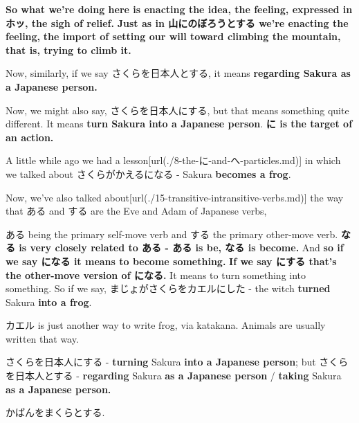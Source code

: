 \thinrule

{\bf So what we're doing here is enacting the idea, the feeling, expressed in ホッ, the sigh of relief.} {\bf Just as in 山にのぼろうとする we're enacting the feeling,} {\bf the import of setting our will toward climbing the mountain, that is, trying to climb it.}

\startsectionlevel[title={とする & にする},reference={とする-にする}]

Now, similarly, if we say さくらを日本人とする, it means {\bf regarding Sakura as a Japanese person.}

{}

Now, we might also say, さくらを日本人にする, but that means something quite different. It means {\bf turn Sakura into a Japanese person}. {\bf に is the target of an action.}

\thinrule

A little while ago we had a lesson\goto{{[}8{]}}[url(./8-the-に-and-へ-particles.md)] in which we talked about さくらがかえるになる - Sakura {\bf becomes a frog}.

{}

Now, we've also talked about\goto{{[}15{]}}[url(./15-transitive-intransitive-verbs.md)] the way that ある and する are the Eve and Adam of Japanese verbs,

{}

ある being the primary self-move verb and する the primary other-move verb. {\bf なる is very closely related to ある - ある is be, なる is become.} And {\bf so if we say になる it means to become something.} {\bf If we say にする that's the other-move version of になる.} It means to turn something into something. So if we say, まじょがさくらをカエルにした - the witch {\bf turned} Sakura {\bf into a frog}.

{}

カエル is just another way to write frog, via katakana. Animals are usually written that way.

さくらを日本人にする - {\bf turning} Sakura {\bf into a Japanese person}; but さくらを日本人とする - {\bf regarding} Sakura {\bf as a Japanese person} / {\bf taking} Sakura {\bf as a Japanese person.}

{}

かばんをまくらとする.

{}

